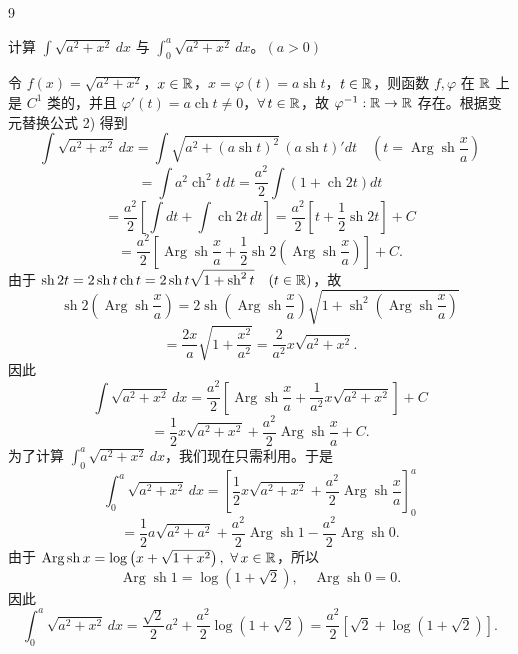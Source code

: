 \begin{sourceexample}{9}

	计算 \(\displaystyle\int\sqrt{a^2+x^2}\,dx\) 与 \(\displaystyle\int_0^a\sqrt{a^2+x^2}\,dx\)。\((a>0)\)

	令 \(f(x)=\sqrt{a^2+x^2}\)，\(x\in\mathbb{R}\)，\(x=\varphi(t)=a\operatorname{sh}t\)，\(t\in\mathbb{R}\)，则函数 \(f,\varphi\) 在 \(\mathbb{R}\) 上是 \(C^1\) 类的，并且 \(\varphi'(t)=a\operatorname{ch}t\neq0\)，\(\forall\,t\in\mathbb{R}\)，故 \(\varphi^{-1}:\mathbb{R}\to\mathbb{R}\) 存在。根据变元替换公式 2) 得到
	\[
	\int\sqrt{a^2+x^2}\,dx=\int\sqrt{a^2+(a\operatorname{sh}t)^2}\,(a\operatorname{sh}t)'dt\quad\left(t=\operatorname{Arg}\operatorname{sh}\frac xa\right)
	\]
	\[
	=\int a^2\operatorname{ch}^2t\,dt=\frac{a^2}{2}\int(1+\operatorname{ch}2t)dt
	\]
	\[
	=\frac{a^2}{2}\left[\int dt+\int\operatorname{ch}2t\,dt\right]=\frac{a^2}{2}\left[t+\frac12\operatorname{sh}2t\right]+C
	\]
	\[
	=\frac{a^2}{2}\left[\operatorname{Arg}\operatorname{sh}\frac xa+\frac12\operatorname{sh}2\left(\operatorname{Arg}\operatorname{sh}\frac xa\right)\right]+C.
	\]
	由于 \(\operatorname{sh}2t=2\operatorname{sh}t\operatorname{ch}t=2\operatorname{sh}t\sqrt{1+\operatorname{sh}^2t}\quad(t\in\mathbb{R})\)，故
	\[
	\operatorname{sh}2\left(\operatorname{Arg}\operatorname{sh}\frac xa\right)=2\operatorname{sh}\left(\operatorname{Arg}\operatorname{sh}\frac xa\right)\sqrt{1+\operatorname{sh}^2\left(\operatorname{Arg}\operatorname{sh}\frac xa\right)}
	\]
	\[
	=\frac{2x}{a}\sqrt{1+\frac{x^2}{a^2}}=\frac2{a^2}x\sqrt{a^2+x^2}.
	\]
	因此
	\[
	\int\sqrt{a^2+x^2}\,dx=\frac{a^2}{2}\left[\operatorname{Arg}\operatorname{sh}\frac xa+\frac1{a^2}x\sqrt{a^2+x^2}\right]+C
	\]
	\[
	=\frac12 x\sqrt{a^2+x^2}+\frac{a^2}{2}\operatorname{Arg}\operatorname{sh}\frac xa+C.
	\]
	为了计算 \(\displaystyle\int_0^a\sqrt{a^2+x^2}\,dx\)，我们现在只需利用。于是
	\[
	\int_0^a\sqrt{a^2+x^2}\,dx=\left[\frac12x\sqrt{a^2+x^2}+\frac{a^2}{2}\operatorname{Arg}\operatorname{sh}\frac xa\right]_0^a
	\]
	\[
	=\frac12a\sqrt{a^2+a^2}+\frac{a^2}{2}\operatorname{Arg}\operatorname{sh}1-\frac{a^2}{2}\operatorname{Arg}\operatorname{sh}0.
	\]
	由于 \(\operatorname{Arg}\operatorname{sh}x=\log\left(x+\sqrt{1+x^2}\right),\ \forall\,x\in\R\)，所以
	\[
	\operatorname{Arg}\operatorname{sh}1=\log(1+\sqrt2),\quad\operatorname{Arg}\operatorname{sh}0=0.
	\]
	因此
	\[
	\int_0^a\sqrt{a^2+x^2}\,dx=\frac{\sqrt2}{2}a^2+\frac{a^2}{2}\log(1+\sqrt2)=\frac{a^2}{2}\left[\sqrt2+\log(1+\sqrt2)\right].
	\]

\end{sourceexample}

